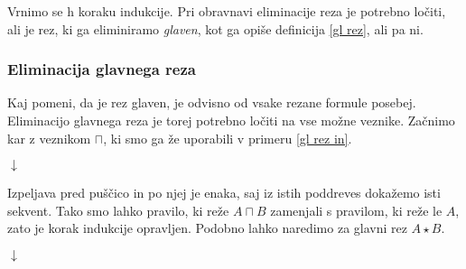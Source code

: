 Vrnimo se h koraku indukcije. Pri obravnavi eliminacije reza je potrebno ločiti, ali je rez, ki ga eliminiramo \emph{glaven}, kot ga opiše definicija \ref{gl rez}, ali pa ni.

\subsubsection{Eliminacija glavnega reza}

Kaj pomeni, da je rez glaven, je odvisno od vsake rezane formule posebej. Eliminacijo glavnega reza je torej potrebno ločiti na vse možne veznike. Začnimo kar z veznikom $\sqcap$, ki smo ga že uporabili v primeru \ref{gl rez in}.
\begin{prooftree}


\end{prooftree}
\begin{center}
    $\downarrow$
\end{center}
\begin{prooftree}
\end{prooftree}
Izpeljava pred puščico in po njej je enaka, saj iz istih poddreves dokažemo isti sekvent. Tako smo lahko pravilo, ki reže $A \sqcap B$ zamenjali s pravilom, ki reže le $A$, zato je korak indukcije opravljen. Podobno lahko naredimo za glavni rez $A \star B$.
\begin{prooftree}


\end{prooftree}
\begin{center}
    $\downarrow$
\end{center}
